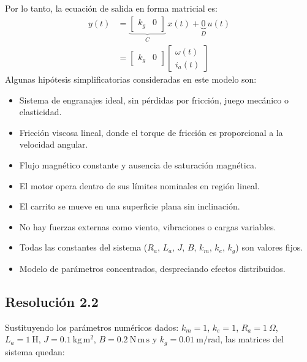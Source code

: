 \documentclass[
  11pt,
  letterpaper,
   addpoints,
   answers
  ]{exam}
\begin{document}
\begin{solution}
Por lo tanto, la ecuación de salida en forma matricial es:
\begin{align}
  y(t) &= \underbrace{\begin{bmatrix}k_g & 0\end{bmatrix}}_{C}\,x(t) + \underbrace{0}_{D}\,u(t) \\
  &= \begin{bmatrix} k_g & 0 \end{bmatrix} \begin{bmatrix} \omega(t)\\ i_a(t) \end{bmatrix}
\end{align}
Algunas hipótesis simplificatorias consideradas en este modelo son:
\begin{itemize}
  \item Sistema de engranajes ideal, sin pérdidas por fricción, juego mecánico o elasticidad.
  \item Fricción viscosa lineal, donde el torque de fricción es proporcional a la velocidad angular.
  \item Flujo magnético constante y ausencia de saturación magnética.
  \item El motor opera dentro de sus límites nominales en región lineal.
  \item El carrito se mueve en una superficie plana sin inclinación.
  \item No hay fuerzas externas como viento, vibraciones o cargas variables.
  \item Todas las constantes del sistema ($R_a$, $L_a$, $J$, $B$, $k_m$, $k_e$, $k_g$) son valores fijos.
  \item Modelo de parámetros concentrados, despreciando efectos distribuidos.
\end{itemize}
\subsection*{Resolución 2.2}

Sustituyendo los parámetros numéricos dados: $k_m=1$, $k_e=1$, $R_a=1~\Omega$, $L_a=1~\mathrm{H}$, $J=0.1~\mathrm{kg\,m^2}$, $B=0.2~\mathrm{N\,m\,s}$ y $k_g=0.01~\mathrm{m/rad}$, las matrices del sistema quedan:


\end{solution}
\end{document}
